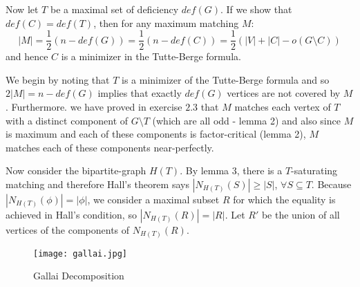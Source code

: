 \documentclass[12pt]{article}
\begin{document}
Now let $T$ be a maximal set of deficiency $def(G)$. If we show that $def(C) = def(T)$, then for any maximum matching $M$:
$$|M| = \frac{1}{2}(n-def(G)) = \frac{1}{2}(n-def(C)) = \frac{1}{2}(|V|+|C|-o(G \setminus C))$$
and hence $C$ is a minimizer in the Tutte-Berge formula.

We begin by noting that $T$ is a minimizer of the Tutte-Berge formula and so $2|M| = n - def(G)$ implies that exactly $def(G)$ vertices are not covered by $M$. Furthermore. we have proved in exercise $2.3$ that $M$ matches each vertex of $T$ with a distinct component of $G \setminus T$ (which are all odd - lemma 2) and also since $M$ is maximum and each of these components is factor-critical (lemma 2), $M$ matches each of these components near-perfectly.

Now consider the bipartite-graph $H(T)$. By lemma 3, there is a $T$-saturating matching and therefore Hall's theorem says $|N_{H(T)}(S)| \geq |S|$, $\forall S \subseteq T$. Because $|N_{H(T)}(\phi)| = |\phi|$, we consider a maximal subset $R$ for which the equality is achieved in Hall's condition, so $|N_{H(T)}(R)| = |R|$. Let $R'$ be the union of all vertices of the components of $N_{H(T)}(R)$.
\newline

\begin{figure}[htp]
    \centering
    \texttt{[image: gallai.jpg]}
    \caption{Gallai Decomposition}
    \label{fig:gallai}
\end{figure}
\end{document}
